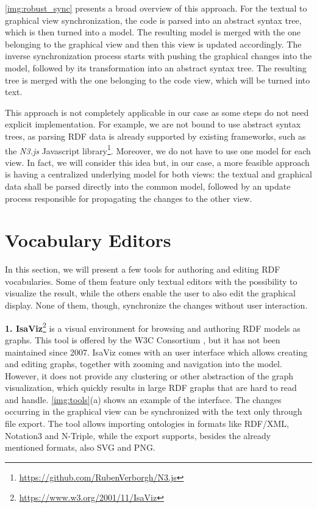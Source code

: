 \autoref{img:robust_sync} presents a broad overview of this approach. For the textual to graphical view synchronization, the code is parsed into an abstract syntax tree, which is then turned into a model. The resulting model is merged with the one belonging to the graphical view and then this view is updated accordingly. The inverse synchronization process starts with pushing the graphical changes into the model, followed by its transformation into an abstract syntax tree. The resulting tree is merged with the one belonging to the code view, which will be turned into text.

This approach is not completely applicable in our case as some steps do not need explicit implementation. For example, we are not bound to use abstract syntax trees, as parsing RDF data is already supported by existing frameworks, such as the \textit{N3.js} Javascript library\footnote{\url{https://github.com/RubenVerborgh/N3.js}}. Moreover, we do not have to use one model for each view. In fact, we will consider this idea but, in our case, a more feasible approach is having a centralized underlying model for both views: the textual and graphical data shall be parsed directly into the common model, followed by an update process responsible for propagating the changes to the other view.

\section{Vocabulary Editors}
\label{sec:editors}

In this section, we will present a few tools for authoring and editing RDF vocabularies. Some of them feature only textual editors with the possibility to visualize the result, while the others enable the user to also edit the graphical display. None of them, though, synchronize the changes without user interaction.

\textbf{1. IsaViz}\footnote{\url{https://www.w3.org/2001/11/IsaViz}} is a visual environment for browsing and authoring RDF models as graphs. This tool is offered by the W3C Consortium \cite{Kapoor2010}, but it has not been maintained since 2007. IsaViz comes with an user interface which allows creating and editing graphs, together with zooming and navigation into the model. However, it does not provide any clustering or other abstraction of the graph visualization, which quickly results in large RDF graphs that are hard to read and handle. \autoref{img:tools}(a) shows an example of the interface. The changes occurring in the graphical view can be synchronized with the text only through file export. The tool allows importing ontologies in formats like RDF/XML, Notation3 and N-Triple, while the export supports, besides the already mentioned formats, also SVG and PNG.

